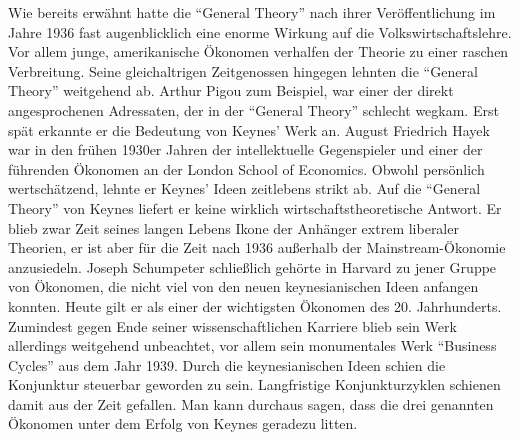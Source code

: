 Wie bereits erwähnt hatte die "`General Theory"' nach ihrer Veröffentlichung im Jahre 1936 fast augenblicklich eine enorme Wirkung auf die Volkswirtschaftslehre. Vor allem junge, amerikanische Ökonomen verhalfen der Theorie zu einer raschen Verbreitung. Seine gleichaltrigen Zeitgenossen hingegen lehnten die "`General Theory"' weitgehend ab. Arthur Pigou zum Beispiel, war einer der direkt angesprochenen Adressaten, der in der "`General Theory"' schlecht wegkam. Erst spät erkannte er die Bedeutung von Keynes' Werk an. August Friedrich Hayek war in den frühen 1930er Jahren der intellektuelle Gegenspieler und einer der führenden Ökonomen an der London School of Economics. Obwohl persönlich wertschätzend, lehnte er Keynes' Ideen zeitlebens strikt ab. Auf die "`General Theory"' von Keynes liefert er keine wirklich wirtschaftstheoretische Antwort. Er blieb zwar Zeit seines langen Lebens Ikone der Anhänger extrem liberaler Theorien, er ist aber für die Zeit nach 1936 außerhalb der Mainstream-Ökonomie anzusiedeln. Joseph Schumpeter schließlich gehörte in Harvard zu jener Gruppe von Ökonomen, die nicht viel von den neuen keynesianischen Ideen anfangen konnten. Heute gilt er als einer der wichtigsten Ökonomen des 20. Jahrhunderts. Zumindest gegen Ende seiner wissenschaftlichen Karriere blieb sein Werk allerdings weitgehend unbeachtet, vor allem sein monumentales Werk "`Business Cycles"' aus dem Jahr 1939. Durch die keynesianischen Ideen schien die Konjunktur steuerbar geworden zu sein. Langfristige Konjunkturzyklen schienen damit aus der Zeit gefallen. Man kann durchaus sagen, dass die drei genannten Ökonomen unter dem Erfolg von Keynes geradezu litten.

